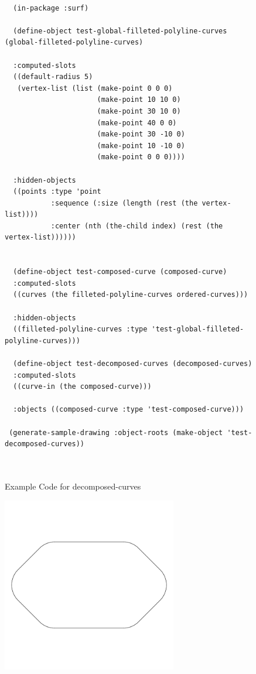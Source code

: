 \documentclass [11pt]{book}
\begin{document}
\begin{itemize}
\begin{figure}
\begin{lrbox}{\boxedverb}
\begin{minipage}{\linewidth}
{\begin{verbatim}
  
  (in-package :surf)  

  (define-object test-global-filleted-polyline-curves (global-filleted-polyline-curves)
                    
  :computed-slots
  ((default-radius 5)
   (vertex-list (list (make-point 0 0 0)
                      (make-point 10 10 0)
                      (make-point 30 10 0)
                      (make-point 40 0 0)
                      (make-point 30 -10 0)
                      (make-point 10 -10 0)
                      (make-point 0 0 0))))

  :hidden-objects
  ((points :type 'point
           :sequence (:size (length (rest (the vertex-list))))
           :center (nth (the-child index) (rest (the vertex-list))))))


  (define-object test-composed-curve (composed-curve)
  :computed-slots
  ((curves (the filleted-polyline-curves ordered-curves)))
  
  :hidden-objects
  ((filleted-polyline-curves :type 'test-global-filleted-polyline-curves)))

  (define-object test-decomposed-curves (decomposed-curves)
  :computed-slots
  ((curve-in (the composed-curve)))
  
  :objects ((composed-curve :type 'test-composed-curve)))

 (generate-sample-drawing :object-roots (make-object 'test-decomposed-curves))

 
\end{verbatim}}
\end{minipage}
\end{lrbox}
\fbox{\usebox{\boxedverb}}

\caption{Example Code for decomposed-curves}

\label{fig:example-code-decomposed-curves}

\end{figure}

\begin{figure}
\begin{center}
\includegraphics[width=3in,height=3in]{../images/example-decomposed-curves.pdf}
\end{center}


\end{figure}
\end{itemize}
\end{document}
